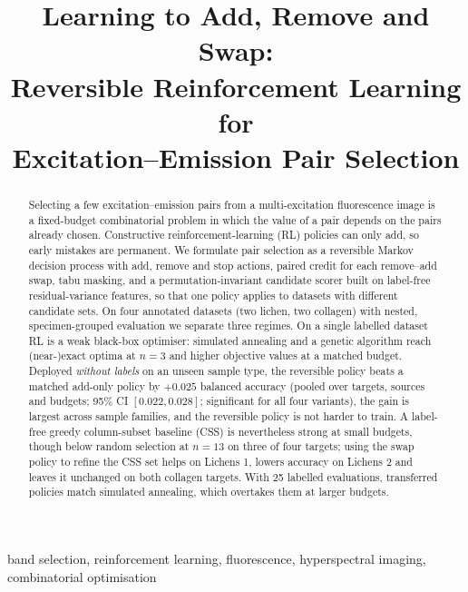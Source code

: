 \documentclass[conference]{IEEEtran}
\begin{document}
\title{Learning to Add, Remove and Swap:\\ Reversible Reinforcement Learning for\\ Excitation--Emission Pair Selection}

\author{
\IEEEauthorblockA{\textit{[Affiliations]}}}

\maketitle

\begin{abstract}
Selecting a few excitation--emission pairs from a multi-excitation fluorescence image is a fixed-budget combinatorial problem in which the value of a pair depends on the pairs already chosen. Constructive reinforcement-learning (RL) policies can only add, so early mistakes are permanent. We formulate pair selection as a reversible Markov decision process with add, remove and stop actions, paired credit for each remove--add swap, tabu masking, and a permutation-invariant candidate scorer built on label-free residual-variance features, so that one policy applies to datasets with different candidate sets. On four annotated datasets (two lichen, two collagen) with nested, specimen-grouped evaluation we separate three regimes. On a single labelled dataset RL is a weak black-box optimiser: simulated annealing and a genetic algorithm reach (near-)exact optima at $n=3$ and higher objective values at a matched budget. Deployed \emph{without labels} on an unseen sample type, the reversible policy beats a matched add-only policy by $+0.025$ balanced accuracy (pooled over targets, sources and budgets; 95\% CI $[0.022,0.028]$; significant for all four variants), the gain is largest across sample families, and the reversible policy is not harder to train. A label-free greedy column-subset baseline (CSS) is nevertheless strong at small budgets, though below random selection at $n=13$ on three of four targets; using the swap policy to refine the CSS set helps on Lichens 1, lowers accuracy on Lichens 2 and leaves it unchanged on both collagen targets. With 25 labelled evaluations, transferred policies match simulated annealing, which overtakes them at larger budgets.
\end{abstract}

\begin{IEEEkeywords}
band selection, reinforcement learning, fluorescence, hyperspectral imaging, combinatorial optimisation
\end{IEEEkeywords}
\end{document}
